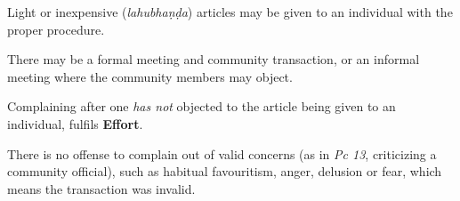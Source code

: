 Light or inexpensive (\emph{lahubhaṇḍa}) articles may be given to an
individual with the proper procedure.

There may be a formal meeting and community transaction, or an informal
meeting where the community members may object.

Complaining after one \emph{has not} objected to the article being given
to an individual, fulfils \textbf{Effort}.

There is no offense to complain out of valid concerns (as in \emph{Pc
13}, criticizing a community official), such as habitual favouritism,
anger, delusion or fear, which means the transaction was invalid.

